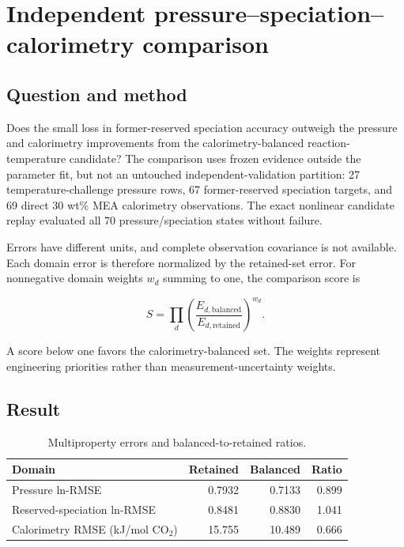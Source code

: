\section{Independent pressure--speciation--calorimetry comparison}

\subsection{Question and method}

Does the small loss in former-reserved speciation accuracy outweigh the pressure and
calorimetry improvements from the calorimetry-balanced reaction-temperature
candidate? The comparison uses frozen evidence outside the parameter fit, but
not an untouched independent-validation partition: 27 temperature-challenge
pressure rows, 67 former-reserved speciation targets, and 69
direct 30 wt\% MEA calorimetry observations. The exact nonlinear candidate
replay evaluated all 70 pressure/speciation states without failure.

Errors have different units, and complete observation covariance is not
available. Each domain error is therefore normalized by the retained-set error.
For nonnegative domain weights $w_d$ summing to one, the comparison score is

\[
S=\prod_d\left(\frac{E_{d,\mathrm{balanced}}}
{E_{d,\mathrm{retained}}}\right)^{w_d}.
\]

A score below one favors the calorimetry-balanced set. The weights represent
engineering priorities rather than measurement-uncertainty weights.

\subsection{Result}

\begin{table}[htbp]
\centering
\caption{Multiproperty errors and balanced-to-retained ratios.}
\begin{tabular}{lrrr}
\toprule
Domain & Retained & Balanced & Ratio \\
\midrule
Pressure ln-RMSE & 0.7932 & 0.7133 & 0.899 \\
Reserved-speciation ln-RMSE & 0.8481 & 0.8830 & 1.041 \\
Calorimetry RMSE (kJ/mol CO$_2$) & 15.755 & 10.489 & 0.666 \\
\bottomrule
\end{tabular}
\end{table}

